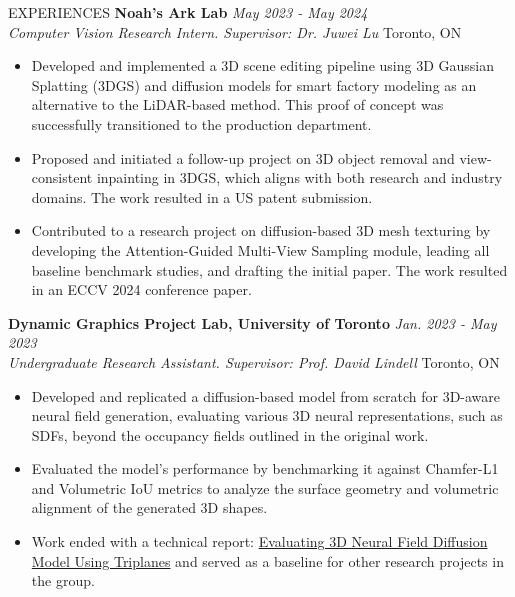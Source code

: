\documentclass{resume} %
\begin{document}
\begin{rSection}{EXPERIENCES}
{\bf Noah's Ark Lab} \hfill {\em May 2023 - May 2024} 
\\{\textit{Computer Vision Research Intern. Supervisor: Dr. Juwei Lu} \hfill {Toronto, ON}}
\begin{itemize}
    \vspace{-0.2cm}\item Developed and implemented a 3D scene editing pipeline using 3D Gaussian Splatting (3DGS) and diffusion models for smart factory modeling as an alternative to the LiDAR-based method. This proof of concept was successfully transitioned to the production department. \vspace{-0.2cm}\item Proposed and initiated a follow-up project on 3D object removal and view-consistent inpainting in 3DGS, which aligns with both research and industry domains. The work resulted in a US patent submission. \vspace{-0.2cm}\item Contributed to a research project on diffusion-based 3D mesh texturing by developing the Attention-Guided Multi-View Sampling module, leading all baseline benchmark studies, and drafting the initial paper. The work resulted in an ECCV 2024 conference paper.
\end{itemize}


{\bf Dynamic Graphics Project Lab, University of Toronto} \hfill {\em Jan. 2023 - May 2023} 
\\{\textit{Undergraduate Research Assistant. Supervisor: Prof. David Lindell} \hfill {Toronto, ON}}
\begin{itemize}
    \vspace{-0.2cm}\item Developed and replicated a diffusion-based model from scratch for 3D-aware neural field generation, evaluating various 3D neural representations, such as SDFs, beyond the occupancy fields outlined in the original work. 
    \vspace{-0.2cm}\item Evaluated the model’s performance by benchmarking it against Chamfer-L1 and Volumetric IoU metrics to analyze the surface geometry and volumetric alignment of the generated 3D shapes. 
    \vspace{-0.2cm}\item Work ended with a technical report: \href{https://drive.google.com/file/d/1VXK9EWMUM-Mzs3i1IDi4z0Kqh7Iy-uvX/view}{Evaluating 3D Neural Field Diffusion Model Using Triplanes} and served as a baseline for other research projects in the group.
\end{itemize}


\end{rSection}
\end{document}

